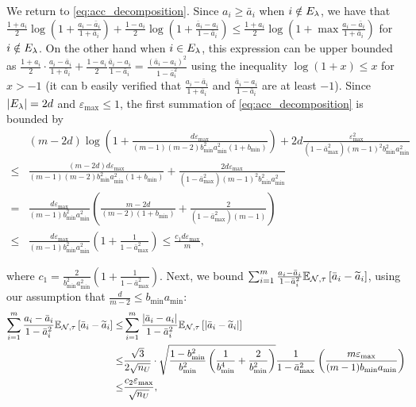 We return to \eqref{eq:acc_decomposition}. Since $a_i \ge \bar{a}_i$ when $i \notin E_{\lambda}$, we have that $\frac{1 + a_i}{2}\log(1 + \frac{a_i - \bar{a}_i}{1 + \bar{a}_i}) + \frac{1 - a_i}{2} \log (1 + \frac{\bar{a}_i - a_i}{1 - \bar{a}_i}) \le \frac{1 + a_i}{2} \log (1 + \max \frac{a_i - \bar{a}_i}{1 + \bar{a}_i})$ for $i \notin E_{\lambda}$. On the other hand when $i \in E_{\lambda}$, this expression can be upper bounded as $\frac{1+a_i}{2} \cdot \frac{a_i - \bar{a}_i}{1 + \bar{a}_i} + \frac{1 - a_i}{2} \frac{\bar{a}_i - a_i}{1 - \bar{a}_i} = \frac{(\bar{a}_i - a_i)^2}{1 - \bar{a}_i^2}$ using the inequality $\log(1 + x) \le x$ for $x > -1$ (it can b easily verified that $\frac{a_i - \bar{a}_i}{1 + \bar{a}_i}$ and $\frac{\bar{a}_i - a_i}{1 - \bar{a}_i}$ are at least $-1$). Since $|E_{\lambda}| = 2d$ and $\varepsilon_{\max} \le 1$, the first summation of \eqref{eq:acc_decomposition} is bounded by 
\begin{align}
    &(m - 2d) \log \left(1 + \frac{d\varepsilon_{\max}}{(m - 1)(m - 2) b_{\min}^2 a_{\min}^2 (1 + b_{\min})} \right) + 2d \frac{\varepsilon_{\max}^2}{(1 - \bar{a}_{\max}^2) (m - 1)^2 b_{\min}^2 a_{\min}^2} \\
    \le &\frac{(m - 2d) d\varepsilon_{\max}}{(m - 1)(m - 2) b_{\min}^2 a_{\min}^2 (1 + b_{\min})} + \frac{2d \varepsilon_{\max}}{(1 - \bar{a}_{\max}^2) (m - 1)^2 b_{\min}^2 a_{\min}^2} \\
    = & \frac{d\varepsilon_{\max}}{(m - 1)b_{\min}^2 a_{\min}^2} \left( \frac{m - 2d}{(m - 2)(1 + b_{\min})} + \frac{2}{(1 - \bar{a}_{\max}^2)(m - 1)}\right) \\
    \le & \frac{d\varepsilon_{\max}}{(m - 1)b_{\min}^2 a_{\min}^2} \left(1 + \frac{1}{1 - \bar{a}_{\max}^2}\right) \le \frac{c_1 d \varepsilon_{\max}}{m},
\end{align}

where $c_1 = \frac{2}{b_{\min}^2 a_{\min}^2} \left(1 + \frac{1}{1 - \bar{a}_{\max}^2} \right)$. Next, we bound $\sum_{i = 1}^m \frac{a_i - \bar{a}_i}{1 - \bar{a}_i^2} \mathbb{E}_{\mathcal{N}, \tau}\left[\bar{a}_i - \widetilde{a}_i\right]$, using  our assumption that $\frac{d}{m - 2} \le b_{\min} a_{\min}$:
\begin{align}
    \sum_{i = 1}^m \frac{a_i - \bar{a}_i}{1 - \bar{a}_i^2} \mathbb{E}_{\mathcal{N}, \tau}\left[\bar{a}_i - \widetilde{a}_i\right] \le &\sum_{i = 1}^m \frac{|\bar{a}_i - a_i|}{1 - \bar{a}_i^2} \mathbb{E}_{\mathcal{N}, \tau}\left[|\bar{a}_i - \widetilde{a}_i|\right] \\
    \le &\frac{\sqrt{3}}{2\sqrt{n_U}} \cdot \sqrt{\frac{1 - b_{\min}^2}{b_{\min}^2} \left(\frac{1}{b_{\min}^4} + \frac{2}{b_{\min}^2} \right)} \frac{1}{1 - \bar{a}_{\max}^2} \left(\frac{m \varepsilon_{\max}}{(m - 1) b_{\min} a_{\min}}\right) \\
    \le &\frac{c_2 \varepsilon_{\max}}{ \sqrt{n_U}},
\end{align}

